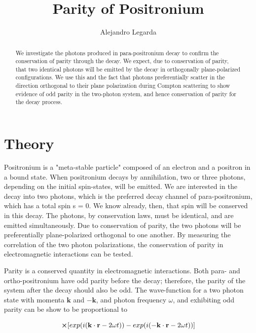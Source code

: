 \documentclass{article}
\title{Parity of Positronium}
\author{Alejandro Legarda}
\renewcommand{\vec}[1]{\mathbf{#1}}
\begin{document}
\raggedright
\maketitle

\begin{abstract}
We investigate the photons produced in para-positronium decay to confirm the conservation of parity through the decay. We expect, due to conservation of parity, that two identical photons will be emitted by the decay in orthogonally plane-polarized configurations. We use this and the fact that photons preferentially scatter in the direction orthogonal to their plane polarization during Compton scattering to show evidence of odd parity in the two-photon system, and hence conservation of parity for the decay process.
\end{abstract}
	
	
\tableofcontents
\newpage

\section{Theory}

Positronium is a "meta-stable particle" composed of an electron and a positron in a bound state. When positronium decays by annihilation, two or three photons, depending on the initial spin-states, will be emitted. We are interested in the decay into two photons, which is the preferred decay channel of para-positronium, which has a total spin s = 0. We know already, then, that spin will be conserved in this decay. The photons, by conservation laws, must be identical, and are emitted simultaneously. Due to conservation of parity, the two photons will be preferentially plane-polarized orthogonal to one another. By measuring the correlation of the two photon polarizations, the conservation of parity in electromagnetic interactions can be tested.

\hspace{.25cm}

Parity is a conserved quantity in electromagnetic interactions. Both para- and ortho-positronium have odd parity before the decay; therefore, the parity of the system after the decay should also be odd. The wave-function for a two photon state with momenta $\vec{k}$ and $\vec{-k}$, and photon frequency $\omega$, and exhibiting odd parity can be show to be proportional to

\begin{equation}
	[\braket{|\hat{\epsilon_1}}\braket{|\hat{\epsilon_2}} - \braket{|\hat{\epsilon_2}} \braket{|\hat{\epsilon_1}}] \cross [exp(i (\vec{k} \cdot \vec{r} - 2\omega t)) - exp(i (- \vec{k} \cdot \vec{r} - 2\omega t))]
\end{equation}
\end{document}
